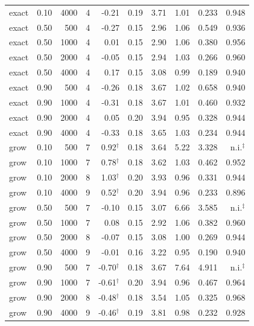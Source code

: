 \begin{table}[t]
\begin{tabular}{lrr r r@{$\,\pm\,$}l r rr r}
exact & 0.10 & 4000 & 4 & -0.21 & 0.19 & 3.71 & 1.01 & 0.233 & 0.948 \\
\addlinespace
exact & 0.50 & 500 & 4 & -0.27 & 0.15 & 2.96 & 1.06 & 0.549 & 0.936 \\
exact & 0.50 & 1000 & 4 & 0.01 & 0.15 & 2.90 & 1.06 & 0.380 & 0.956 \\
exact & 0.50 & 2000 & 4 & -0.05 & 0.15 & 2.94 & 1.03 & 0.266 & 0.960 \\
exact & 0.50 & 4000 & 4 & 0.17 & 0.15 & 3.08 & 0.99 & 0.189 & 0.940 \\
\addlinespace
exact & 0.90 & 500 & 4 & -0.26 & 0.18 & 3.67 & 1.02 & 0.658 & 0.940 \\
exact & 0.90 & 1000 & 4 & -0.31 & 0.18 & 3.67 & 1.01 & 0.460 & 0.932 \\
exact & 0.90 & 2000 & 4 & 0.05 & 0.20 & 3.94 & 0.95 & 0.328 & 0.944 \\
exact & 0.90 & 4000 & 4 & -0.33 & 0.18 & 3.65 & 1.03 & 0.234 & 0.944 \\
\addlinespace
grow & 0.10 & 500 & 7 & 0.92$^\dagger$ & 0.18 & 3.64 & 5.22 & 3.328 & n.i.$^\ddagger$ \\
grow & 0.10 & 1000 & 7 & 0.78$^\dagger$ & 0.18 & 3.62 & 1.03 & 0.462 & 0.952 \\
grow & 0.10 & 2000 & 8 & 1.03$^\dagger$ & 0.20 & 3.93 & 0.96 & 0.331 & 0.944 \\
grow & 0.10 & 4000 & 9 & 0.52$^\dagger$ & 0.20 & 3.94 & 0.96 & 0.233 & 0.896 \\
\addlinespace
grow & 0.50 & 500 & 7 & -0.10 & 0.15 & 3.07 & 6.66 & 3.585 & n.i.$^\ddagger$ \\
grow & 0.50 & 1000 & 7 & 0.08 & 0.15 & 2.92 & 1.06 & 0.382 & 0.960 \\
grow & 0.50 & 2000 & 8 & -0.07 & 0.15 & 3.08 & 1.00 & 0.269 & 0.944 \\
grow & 0.50 & 4000 & 9 & -0.01 & 0.16 & 3.22 & 0.95 & 0.190 & 0.940 \\
\addlinespace
grow & 0.90 & 500 & 7 & -0.70$^\dagger$ & 0.18 & 3.67 & 7.64 & 4.911 & n.i.$^\ddagger$ \\
grow & 0.90 & 1000 & 7 & -0.61$^\dagger$ & 0.20 & 3.94 & 0.96 & 0.467 & 0.964 \\
grow & 0.90 & 2000 & 8 & -0.48$^\dagger$ & 0.18 & 3.54 & 1.05 & 0.325 & 0.968 \\
grow & 0.90 & 4000 & 9 & -0.46$^\dagger$ & 0.19 & 3.81 & 0.98 & 0.232 & 0.928 \\
\bottomrule\end{tabular}\end{table}
